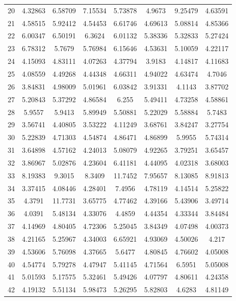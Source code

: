 \begin{figure}
\begin{tabular}{cccccccc}
20 & 4.32863 & 6.58709 & 7.15534 & 5.73878 & 4.9673 & 9.25479 & 4.63591\\
21 & 4.58515 & 5.92412 & 4.54453 & 6.61746 & 4.69613 & 5.08814 & 4.85366\\
22 & 6.00347 & 6.50191 & 6.3624 & 6.01132 & 5.38336 & 5.32833 & 5.27424\\
23 & 6.78312 & 5.7679 & 5.76984 & 6.15646 & 4.53631 & 5.10059 & 4.22117\\
24 & 4.15093 & 4.83111 & 4.07263 & 4.37794 & 3.9183 & 4.14817 & 4.11683\\
25 & 4.08559 & 4.49268 & 4.44348 & 4.66311 & 4.94022 & 4.63474 & 4.7046\\
26 & 3.84831 & 4.98009 & 5.01961 & 6.03842 & 3.91331 & 4.1143 & 3.87702\\
27 & 5.20843 & 5.37292 & 4.86584 & 6.255 & 5.49411 & 4.73258 & 4.58861\\
28 & 5.9557 & 5.9413 & 5.89949 & 5.50881 & 5.22029 & 5.58884 & 5.7483\\
29 & 3.56741 & 4.40805 & 3.53222 & 4.11249 & 3.68761 & 3.84247 & 3.27754\\
30 & 5.22839 & 4.71303 & 4.54874 & 4.86471 & 4.86899 & 5.9955 & 5.74314\\
31 & 3.64898 & 4.57162 & 4.24013 & 5.08079 & 4.92265 & 3.79251 & 3.65457\\
32 & 3.86967 & 5.02876 & 4.23604 & 6.41181 & 4.44095 & 4.02318 & 3.68003\\
33 & 8.19383 & 9.3015 & 8.3409 & 11.7452 & 7.95657 & 8.13085 & 8.91813\\
34 & 3.37415 & 4.08446 & 4.28401 & 7.4956 & 4.78119 & 4.14514 & 5.25822\\
35 & 4.3791 & 11.7731 & 3.65775 & 4.77462 & 4.39166 & 5.43906 & 3.49714\\
36 & 4.0391 & 5.48134 & 4.33076 & 4.4859 & 4.44354 & 4.33344 & 3.84484\\
37 & 4.14969 & 4.80405 & 4.72306 & 5.25045 & 3.84349 & 4.07498 & 4.00373\\
38 & 4.21165 & 5.25967 & 4.34003 & 6.65921 & 4.93069 & 4.50026 & 4.217\\
39 & 4.53606 & 5.76098 & 4.37665 & 5.6477 & 4.80845 & 4.76602 & 4.05008\\
40 & 4.54774 & 5.79278 & 4.47947 & 5.41145 & 4.71564 & 6.5951 & 5.05008\\
41 & 5.01593 & 5.17575 & 5.32461 & 5.49426 & 4.07797 & 4.80611 & 4.24358\\
42 & 4.19132 & 5.51134 & 5.98473 & 5.26295 & 5.82803 & 4.6283 & 4.81149\\

\end{tabular}
\end{figure}
